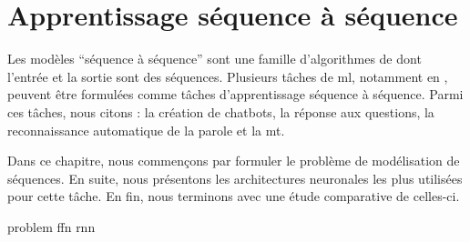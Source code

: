 \chapter{Apprentissage séquence à séquence}

Les modèles ``séquence à séquence'' sont une famille d'algorithmes de 
dont l'entrée et la sortie sont des séquences.
Plusieurs tâches de \acrlong{ml}, notamment en , 
peuvent être formulées comme tâches d'apprentissage séquence à séquence.
Parmi ces tâches, nous citons : la création de chatbots, la réponse aux questions, 
la reconnaissance automatique de la parole et la \acrlong{mt}.

Dans ce chapitre, nous commençons par formuler le problème de modélisation de séquences.
En suite, nous présentons les architectures neuronales les plus utilisées pour cette tâche.
En fin, nous terminons avec une étude comparative de celles-ci.

{problem}
{ffn}
{rnn}

